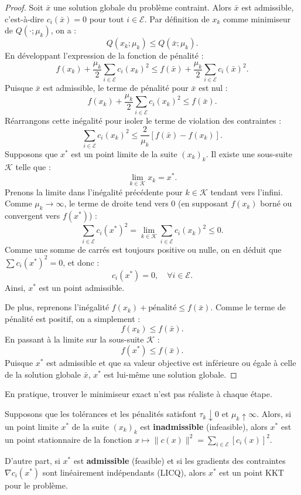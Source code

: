 \begin{proof}
    Soit $\bar{x}$ une solution globale du problème contraint.
    Alors $\bar{x}$ est admissible, c'est-à-dire $c_i(\bar{x}) = 0$ pour tout $i \in \mathcal{E}$.
    Par définition de $x_k$ comme minimiseur de $Q(\cdot; \mu_k)$, on a :
    \[
        Q(x_k; \mu_k) \le Q(\bar{x}; \mu_k).
    \]
    En développant l'expression de la fonction de pénalité :
    \[
        f(x_k) + \frac{\mu_k}{2} \sum_{i \in \mathcal{E}} c_i(x_k)^2 \le f(\bar{x}) + \frac{\mu_k}{2} \sum_{i \in \mathcal{E}} c_i(\bar{x})^2.
    \]
    Puisque $\bar{x}$ est admissible, le terme de pénalité pour $\bar{x}$ est nul :
    \[
        f(x_k) + \frac{\mu_k}{2} \sum_{i \in \mathcal{E}} c_i(x_k)^2 \le f(\bar{x}).
    \]
    Réarrangons cette inégalité pour isoler le terme de violation des contraintes :
    \[
        \sum_{i \in \mathcal{E}} c_i(x_k)^2 \le \frac{2}{\mu_k} [f(\bar{x}) - f(x_k)].
    \]
    Supposons que $x^*$ est un point limite de la suite $(x_k)_k$. Il existe une sous-suite $\mathcal{K}$ telle que :
    \[
        \lim_{k \in \mathcal{K}} x_k = x^*.
    \]
    Prenons la limite dans l'inégalité précédente pour $k \in \mathcal{K}$ tendant vers l'infini. Comme $\mu_k \to \infty$, le terme de droite tend vers 0 (en supposant $f(x_k)$ borné ou convergent vers $f(x^*)$) :
    \[
        \sum_{i \in \mathcal{E}} c_i(x^*)^2 = \lim_{k \in \mathcal{K}} \sum_{i \in \mathcal{E}} c_i(x_k)^2 \le 0.
    \]
    Comme une somme de carrés est toujours positive ou nulle, on en déduit que $\sum c_i(x^*)^2 = 0$, et donc :
    \[
        c_i(x^*) = 0, \quad \forall i \in \mathcal{E}.
    \]
    Ainsi, $x^*$ est un point admissible.
    
    De plus, reprenons l'inégalité $f(x_k) + \text{pénalité} \le f(\bar{x})$. Comme le terme de pénalité est positif, on a simplement :
    \[
        f(x_k) \le f(\bar{x}).
    \]
    En passant à la limite sur la sous-suite $\mathcal{K}$ :
    \[
        f(x^*) \le f(\bar{x}).
    \]
    Puisque $x^*$ est admissible et que sa valeur objective est inférieure ou égale à celle de la solution globale $\bar{x}$, $x^*$ est lui-même une solution globale.
\end{proof}

\begin{remarque}
    En pratique, trouver le minimiseur exact n'est pas réaliste à chaque étape.
\end{remarque}

\begin{theoreme}
    Supposons que les tolérances et les pénalités satisfont $\tau_k \downarrow 0$ et $\mu_k \uparrow \infty$.
    Alors, si un point limite $x^*$ de la suite $(x_k)_k$ est \textbf{inadmissible} (infeasible), alors $x^*$ est un point stationnaire de la fonction $x \mapsto \|c(x)\|^2 = \sum_{i \in \mathcal{E}} [c_i(x)]^2$.
    
    D'autre part, si $x^*$ est \textbf{admissible} (feasible) et si les gradients des contraintes $\nabla c_i(x^*)$ sont linéairement indépendants (LICQ), alors $x^*$ est un point KKT pour le problème.
\end{theoreme}


